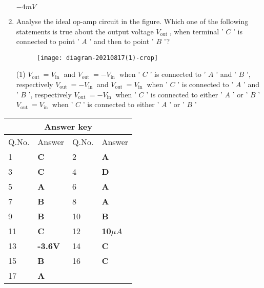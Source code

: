\begin{enumerate}
\begin{tasks}
 		\task[\textbf{D.}] $-4 m V$
 	\end{tasks}
 	\item Analyse the ideal op-amp circuit in the figure. Which one of the following statements is true about the output voltage $V_{\text {out }}$, when terminal ' $C$ ' is connected to point ' $A$ ' and then to point ' $B$ '?
 	{}
 	\begin{figure}[H]
 		\centering
 		\texttt{[image: diagram-20210817(1)-crop]}
 	\end{figure}
 	\begin{tasks}(1)
 		\task[\textbf{A.}] $V_{\text {out }}=V_{\text {in }}$ and $V_{\text {out }}=-V_{\text {in }}$ when ' $C$ ' is connected to ' $A$ ' and ' $B$ ', respectively
 		\task[\textbf{B.}] $V_{\text {out }}=-V_{\text {in }}$ and $V_{\text {out }}=V_{\text {in }}$ when ' $C$ ' is connected to ' $A$ ' and ' $B$ ', respectively
 		\task[\textbf{C.}] $V_{\text {out }}=-V_{\text {in }}$ when ' $C$ ' is connected to either ' $A$ ' or ' $B$ '
 		\task[\textbf{D.}]  $V_{\text {out }}=V_{\text {in }}$ when ' $C$ ' is connected to either ' $A$ ' or ' $B$ '
 	\end{tasks}

 \end{enumerate}
\setlength\arrayrulewidth{1pt}
\begin{table}[H]
	\centering
	\begin{tabular}{|p{1.5cm}|p{1.5cm}||p{1.5cm}|p{1.5cm}|}
		\hline
		\multicolumn{4}{|c|}{\textbf{Answer key}}\\\hline\hline
		\rowcolor{ocrel}Q.No.&Answer&Q.No.&Answer\\\hline
		1&\textbf{C} &2&\textbf{A}\\\hline 
		3&\textbf{C} &4&\textbf{D} \\\hline
		5&\textbf{A} &6&\textbf{A} \\\hline
		7&\textbf{B}&8&\textbf{A}\\\hline
		9&\textbf{B}&10&\textbf{B}\\\hline
		11&\textbf{C} &12&\textbf{10$\mu A$}\\\hline
		13&\textbf{-3.6V}&14&\textbf{C}\\\hline
		15&\textbf{B}&16&\textbf{C}\\\hline
		17&\textbf{A}&&\textbf{}\\\hline
	\end{tabular}
\end{table}